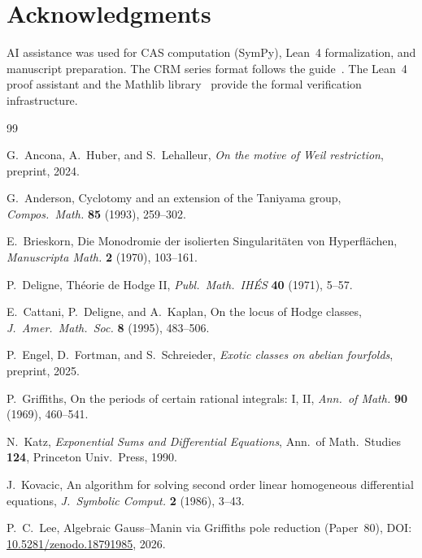 \documentclass[11pt]{article}
\theoremstyle{plain}
\theoremstyle{definition}
\theoremstyle{remark}
\begin{document}
\section*{Acknowledgments}

AI assistance was used for CAS computation (SymPy), Lean~4 formalization,
and manuscript preparation. The CRM series format follows the
guide~\cite{FormatGuide}. The Lean~4 proof assistant and the Mathlib
library~\cite{Mathlib} provide the formal verification infrastructure.

\begin{thebibliography}{99}

G.~Ancona, A.~Huber, and S.~Lehalleur,
\emph{On the motive of Weil restriction},
preprint, 2024.

G.~Anderson,
Cyclotomy and an extension of the Taniyama group,
\emph{Compos.\ Math.} \textbf{85} (1993), 259--302.

E.~Brieskorn,
Die Monodromie der isolierten Singularit\"aten von Hyperfl\"achen,
\emph{Manuscripta Math.} \textbf{2} (1970), 103--161.

P.~Deligne,
Th\'eorie de Hodge II,
\emph{Publ.\ Math.\ IH\'ES} \textbf{40} (1971), 5--57.

E.~Cattani, P.~Deligne, and A.~Kaplan,
On the locus of Hodge classes,
\emph{J.\ Amer.\ Math.\ Soc.} \textbf{8} (1995), 483--506.

P.~Engel, D.~Fortman, and S.~Schreieder,
\emph{Exotic classes on abelian fourfolds},
preprint, 2025.

P.~Griffiths,
On the periods of certain rational integrals: I, II,
\emph{Ann.\ of Math.} \textbf{90} (1969), 460--541.

N.~Katz,
\emph{Exponential Sums and Differential Equations},
Ann.\ of Math.\ Studies \textbf{124}, Princeton Univ.\ Press, 1990.

J.~Kovacic,
An algorithm for solving second order linear homogeneous differential
equations,
\emph{J.\ Symbolic Comput.} \textbf{2} (1986), 3--43.

P.~C.~Lee,
Algebraic Gauss--Manin via Griffiths pole reduction (Paper~80),
DOI: \href{https://doi.org/10.5281/zenodo.18791985}{10.5281/zenodo.18791985}, 2026.


\end{thebibliography}
\end{document}
